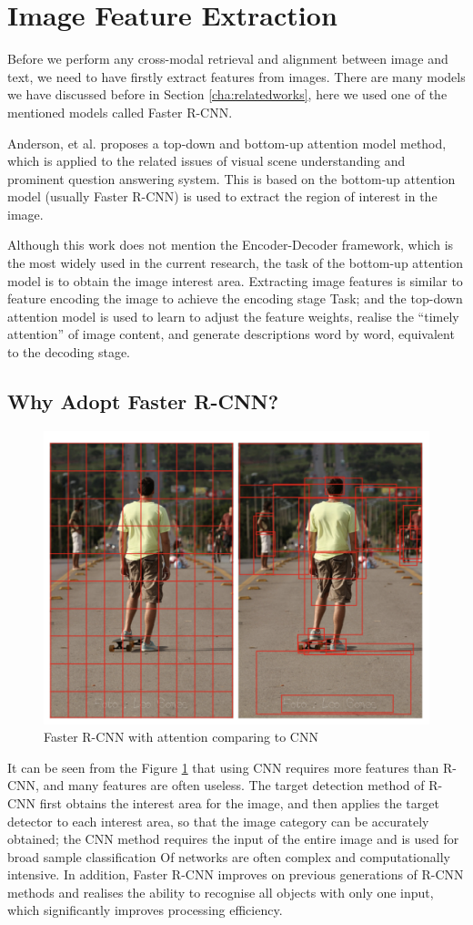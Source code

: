 \section{Image Feature Extraction}
Before we perform any cross-modal retrieval and alignment between image and text, we need to have firstly extract features from images. There are many models we have discussed before in Section \ref{cha:relatedworks}, here we used one of the mentioned models called Faster R-CNN. 

Anderson, et al. \cite{bottomup} proposes a top-down and bottom-up attention model method, which is applied to the related issues of visual scene understanding and prominent question answering system. This is based on the bottom-up attention model (usually Faster R-CNN) is used to extract the region of interest in the image. 

Although this work \cite{bottomup} does not mention the Encoder-Decoder framework, which is the most widely used in the current research, the task of the bottom-up attention model is to obtain the image interest area. Extracting image features is similar to feature encoding the image to achieve the encoding stage Task; and the top-down attention model is used to learn to adjust the feature weights, realise the ``timely attention'' of image content, and generate descriptions word by word, equivalent to the decoding stage.


\subsection{Why Adopt Faster R-CNN?}

\begin{figure}[h!]
\centering
\includegraphics[width=.4\textwidth]{whyfasterrcnn.pdf}
\caption{Faster R-CNN with attention comparing to CNN \cite{bottomup}}
\label{fig:fasterrcnnbottomup}
\end{figure}

It can be seen from the Figure \ref{fig:fasterrcnnbottomup} that using CNN requires more features than R-CNN, and many features are often useless. The target detection method of R-CNN first obtains the interest area for the image, and then applies the target detector to each interest area, so that the image category can be accurately obtained; the CNN method requires the input of the entire image and is used for broad sample classification Of networks are often complex and computationally intensive. In addition, Faster R-CNN improves on previous generations of R-CNN methods and realises the ability to recognise all objects with only one input, which significantly improves processing efficiency.

